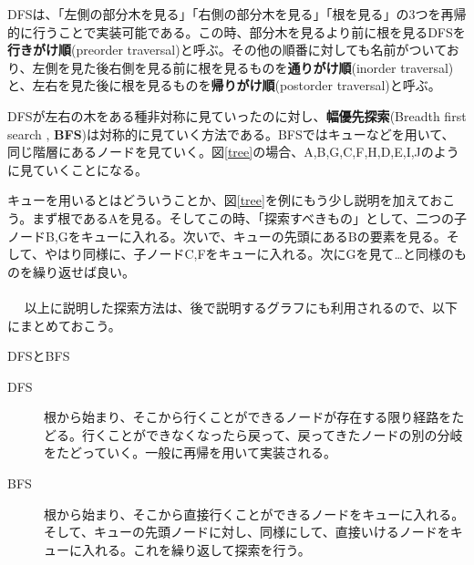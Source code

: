 DFSは、「左側の部分木を見る」「右側の部分木を見る」「根を見る」の3つを再帰的に行うことで実装可能である。この時、部分木を見るより前に根を見るDFSを\textbf{行きがけ順}(preorder traversal)と呼ぶ。その他の順番に対しても名前がついており、左側を見た後右側を見る前に根を見るものを\textbf{通りがけ順}(inorder traversal)と、左右を見た後に根を見るものを\textbf{帰りがけ順}(postorder traversal)と呼ぶ。

DFSが左右の木をある種非対称に見ていったのに対し、\textbf{幅優先探索}(Breadth first search , \textbf{BFS})は対称的に見ていく方法である。BFSではキューなどを用いて、同じ階層にあるノードを見ていく。図\ref{tree}の場合、A,B,G,C,F,H,D,E,I,Jのように見ていくことになる。

キューを用いるとはどういうことか、図\ref{tree}を例にもう少し説明を加えておこう。まず根であるAを見る。そしてこの時、「探索すべきもの」として、二つの子ノードB,Gをキューに入れる。次いで、キューの先頭にあるBの要素を見る。そして、やはり同様に、子ノードC,Fをキューに入れる。次にGを見て…と同様のものを繰り返せば良い。
\\ \\　
以上に説明した探索方法は、後で説明するグラフにも利用されるので、以下にまとめておこう。
\begin{itembox}[l]{DFSとBFS}
\begin{description}
\item[DFS] 根から始まり、そこから行くことができるノードが存在する限り経路をたどる。行くことができなくなったら戻って、戻ってきたノードの別の分岐をたどっていく。一般に再帰を用いて実装される。
\item[BFS] 根から始まり、そこから直接行くことができるノードをキューに入れる。そして、キューの先頭ノードに対し、同様にして、直接いけるノードをキューに入れる。これを繰り返して探索を行う。
\end{description}
\end{itembox}

